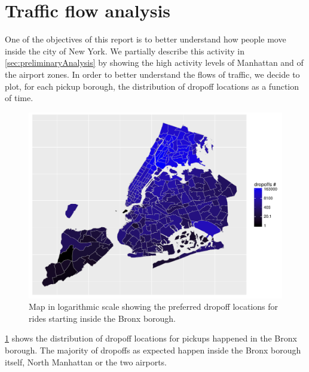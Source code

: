 \documentclass{acm_proc_article-sp-sigmod09}
\begin{document}
\section{Traffic flow analysis}

One of the objectives of this report is to better understand how people move inside the city of New York. We partially describe this activity in \cref{sec:preliminaryAnalysis} by showing the high activity levels of Manhattan and of the airport zones. In order to better understand the flows of traffic, we decide to plot, for each pickup borough, the distribution of dropoff locations as a function of time.

\begin{figure}
	\centering
	\includegraphics[width=1\columnwidth]{resources/base_plots/bronx_dropoff_location_id_dist_map.pdf}
	\caption{Map in logarithmic scale showing the preferred dropoff locations for rides starting inside the Bronx borough.}
	\label{fig:bronxDropoffMap}
\end{figure}

\cref{fig:bronxDropoffMap} shows the distribution of dropoff locations for pickups happened in the Bronx borough. The majority of dropoffs as expected happen inside the Bronx borough itself, North Manhattan or the two airports.
\end{document}
